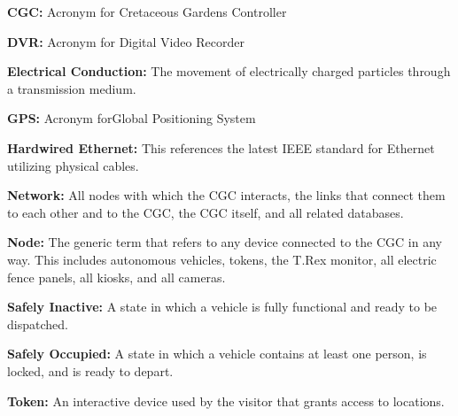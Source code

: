 \documentclass[12pt]{article}
\begin{document}
	\begin{list}{}{}
	\item \textbf{CGC:} Acronym for Cretaceous Gardens Controller 
	\item \textbf{DVR:} Acronym for Digital Video Recorder
	\item \textbf{Electrical Conduction:} The movement of electrically charged particles through a transmission medium.
	\item \textbf{GPS:} Acronym forGlobal Positioning System 
	\item \textbf{Hardwired Ethernet:} This references the latest IEEE standard for Ethernet utilizing physical cables.
	\item \textbf{Network:} All nodes with which the CGC interacts, the links that connect them to each other and to the
	CGC, the CGC itself, and all related databases.
	\item \textbf{Node:} The generic term that refers to any device connected to the CGC in any way. This includes 
	autonomous vehicles, tokens, the T.Rex monitor, all electric fence panels, all kiosks, and all cameras.
	\item \textbf{Safely Inactive:} A state in which a vehicle is fully functional and ready to be dispatched.
	\item \textbf{Safely Occupied:} A state in which a vehicle contains at least one person, is locked, and is ready to depart.
	\item \textbf{Token:} An interactive device used by the visitor that grants access to locations.
	\end{list}
	
\pagebreak
\end{document}
